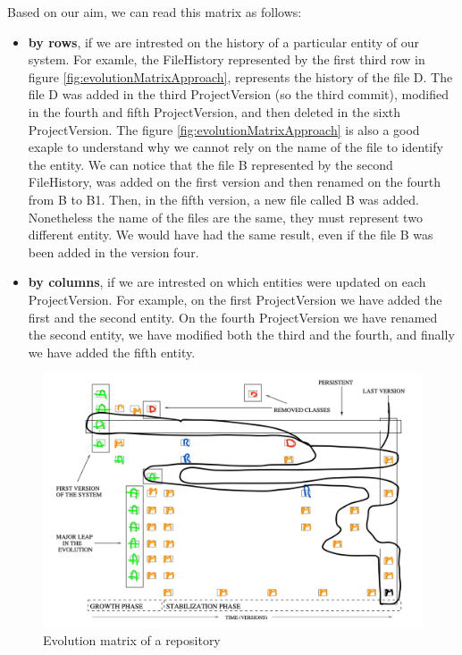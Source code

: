 Based on our aim, we can read this matrix as follows:
 \begin{itemize}
     \item \textbf{by rows}, if we are intrested on the history of a particular entity of our system. 
     For examle, the FileHistory represented by the first third row in figure \ref{fig:evolutionMatrixApproach}, represents the history of the file D. 
     The file D was added in the third ProjectVersion (so the third commit), modified in the fourth and fifth ProjectVersion, and then deleted in the sixth ProjectVersion.
     The figure \ref{fig:evolutionMatrixApproach} is also a good exaple to understand why we cannot rely on the name of the file to identify the entity. 
     We can notice that the file B represented by the second FileHistory, was added on the first version and then renamed on the fourth from B to B1. 
     Then, in the fifth version, a new file called B was added. Nonetheless the name of the files are the same, they must represent two different entity. 
     We would have had the same result, even if the file B was been added in the version four. 
     \item \textbf{by columns}, if we are intrested on which entities were updated on each ProjectVersion. 
    For example, on the first ProjectVersion we have added the first and the second entity. 
    On the fourth ProjectVersion we have renamed the second entity, we have modified both the third and the fourth, and finally we have added the fifth entity.
 \end{itemize}

\begin{figure}
    \center
    \includegraphics[width=\textwidth]{ApproachMatrix2.png}
    \caption{Evolution matrix of a repository}
    \label{fig:evolutionMatrixApproach2}
\end{figure}

